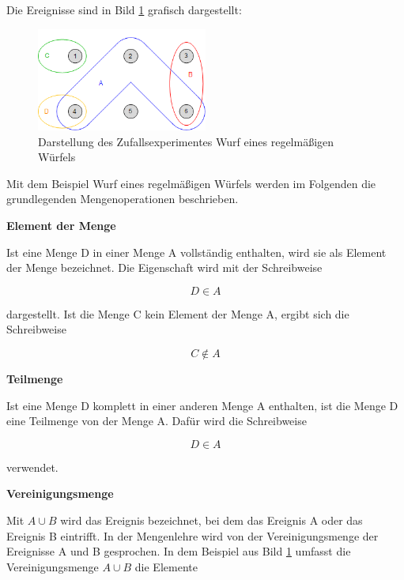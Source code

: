 \noindent Die Ereignisse sind in Bild \ref{fig:Mengen} grafisch dargestellt:

\noindent 
\begin{figure}[H]
  \centerline{\includegraphics[width=0.5\textwidth]{Kapitel2/Bilder/image1}}
  \caption{Darstellung des Zufallsexperimentes Wurf eines regelm\"{a}{\ss}igen W\"{u}rfels}
  \label{fig:Mengen}
\end{figure}

\noindent Mit dem Beispiel Wurf eines regelm\"{a}{\ss}igen W\"{u}rfels werden im Folgenden die grundlegenden Mengenoperationen beschrieben. \bigskip

{\selectfont
\noindent\textbf{Element der Menge}} \smallskip

\noindent Ist eine Menge D in einer Menge A vollst\"{a}ndig enthalten, wird sie als Element der Menge bezeichnet. Die Eigenschaft wird mit der Schreibweise 

\begin{equation}\label{eq:twoeight}
D\in A
\end{equation}

\noindent dargestellt. Ist die Menge C kein Element der Menge A, ergibt sich die Schreibweise

\begin{equation}\label{eq:twonine}
C\notin A
\end{equation}

{\selectfont
\noindent\textbf{Teilmenge}} \smallskip

\noindent Ist eine Menge D komplett in einer anderen Menge A enthalten, ist die Menge D eine Teilmenge von der Menge A. Dafür wird die Schreibweise 

\begin{equation}\label{eq:twoten}
D\in A
\end{equation}

\noindent verwendet. \bigskip

{\selectfont
\noindent\textbf{Vereinigungsmenge}} \smallskip

\noindent Mit $A \cup B$ wird das Ereignis bezeichnet, bei dem das Ereignis A oder das Ereignis B eintrifft. In der Mengenlehre wird von der Vereinigungsmenge der Ereignisse A und B gesprochen. In dem Beispiel aus Bild \ref{fig:Mengen}  umfasst die Vereinigungsmenge $A \cup B$ die Elemente 

